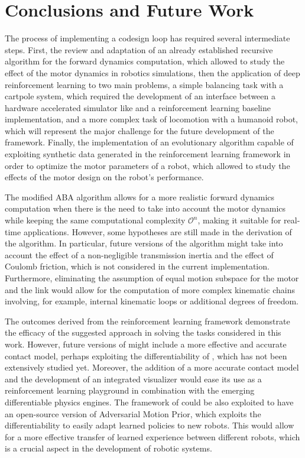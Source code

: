 \chapter{Conclusions and Future Work}
\label{chp:contrib_Conclusions}

The process of implementing a codesign loop has required several intermediate steps. First, the review and adaptation of an already established recursive algorithm for the forward dynamics computation, which allowed to study the effect of the motor dynamics in robotics simulations, then the application of deep reinforcement learning to two main problems, a simple balancing task with a cartpole system, which required the development of an interface between a hardware accelerated simulator like \jaxsim and a reinforcement learning baseline implementation, and a more complex task of locomotion with a humanoid robot, which will represent the major challenge for the future development of the framework. Finally, the implementation of an evolutionary algorithm capable of exploiting synthetic data generated in the reinforcement learning framework in order to optimize the motor parameters of a robot, which allowed to study the effects of the motor design on the robot's performance.

The modified \ac{ABA} algorithm allows for a more realistic forward dynamics computation when there is the need to take into account the motor dynamics while keeping the same computational complexity $\mathcal{O}^n$, making it suitable for real-time applications. However, some hypotheses are still made in the derivation of the algorithm. In particular, future versions of the algorithm might take into account the effect of a non-negligible transmission inertia and the effect of Coulomb friction, which is not considered in the current implementation. Furthermore, eliminating the assumption of equal motion subspace for the motor and the link would allow for the computation of more complex kinematic chains involving, for example, internal kinematic loops or additional degrees of freedom.

The outcomes derived from the reinforcement learning framework demonstrate the efficacy of the suggested approach in solving the tasks considered in this work. However, future versions of \jaxsim might include a more effective and accurate contact model, perhaps exploiting the differentiability of \jax, which has not been extensively studied yet. Moreover, the addition of a more accurate contact model and the development of an integrated visualizer would ease its use as a reinforcement learning playground in combination with the emerging differentiable physics engines.
The framework of \jax could be also exploited to have an open-source version of Adversarial Motion Prior, which exploits the differentiability to easily adapt learned policies to new robots. This would allow for a more effective transfer of learned experience between different robots, which is a crucial aspect in the development of robotic systems.


